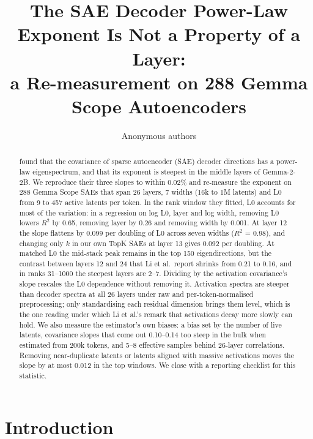 \documentclass[10pt,twocolumn]{article}
\title{The SAE Decoder Power-Law Exponent Is Not a Property of a Layer:\\
a Re-measurement on 288 Gemma Scope Autoencoders}
\author{Anonymous authors}
\date{}
\begin{document}
\maketitle

\begin{abstract}
\citet{li2025geometry} found that the covariance of sparse autoencoder (SAE) decoder directions has a power-law eigenspectrum, and that its exponent is steepest in the middle layers of Gemma-2-2B. We reproduce their three slopes to within 0.02\% and re-measure the exponent on 288 Gemma Scope SAEs that span 26 layers, 7 widths (16k to 1M latents) and L0 from 9 to 457 active latents per token. In the rank window they fitted, L0 accounts for most of the variation: in a regression on log L0, layer and log width, removing L0 lowers $R^2$ by 0.65, removing layer by 0.26 and removing width by 0.001. At layer 12 the slope flattens by 0.099 per doubling of L0 across seven widths ($R^2$ = 0.98), and changing only $k$ in our own TopK SAEs at layer 13 gives 0.092 per doubling. At matched L0 the mid-stack peak remains in the top 150 eigendirections, but the contrast between layers 12 and 24 that Li et al.\ report shrinks from 0.21 to 0.16, and in ranks 31--1000 the steepest layers are 2--7. Dividing by the activation covariance's slope rescales the L0 dependence without removing it. Activation spectra are steeper than decoder spectra at all 26 layers under raw and per-token-normalised preprocessing; only standardising each residual dimension brings them level, which is the one reading under which Li et al.'s remark that activations decay more slowly can hold. We also measure the estimator's own biases: a bias set by the number of live latents, covariance slopes that come out 0.10--0.14 too steep in the bulk when estimated from 200k tokens, and 5--8 effective samples behind 26-layer correlations. Removing near-duplicate latents or latents aligned with massive activations moves the slope by at most 0.012 in the top windows. We close with a reporting checklist for this statistic.
\end{abstract}

\section{Introduction}
\label{sec:intro}
\end{document}

